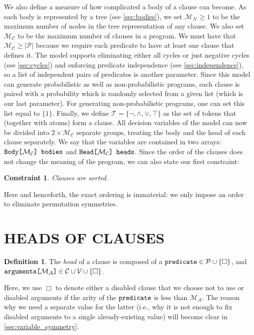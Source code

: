 \documentclass[letterpaper]{article}
\newtheorem{constraint}{Constraint}
\theoremstyle{definition}
\newtheorem{definition}{Definition}
\newcommand{\variable}[1]{\texttt{\textup{#1}}}
\newcommand{\arrayd}[3]{\variable{{#1}[}{#2}\variable{]} \in {#3}}
\newcommand{\arrayt}[3]{\variable{{#3}[}{#2}\variable{] {#1}}}
\newcommand{\predicates}{\mathcal{P}}
\newcommand{\variables}{\mathcal{V}}
\newcommand{\constants}{\mathcal{C}}
\newcommand{\tokens}{\mathcal{T}}
\newcommand{\maxArity}{\mathcal{M}_{\mathcal{A}}}
\newcommand{\maxNumNodes}{\mathcal{M}_{\mathcal{N}}}
\newcommand{\maxNumClauses}{\mathcal{M}_{\mathcal{C}}}
\begin{document}
We also define a measure of how complicated a body of a clause can become. As
each body is represented by a tree (see \cref{sec:bodies}), we set
$\maxNumNodes{} \ge 1$ to be the maximum number of nodes in the tree
representation of any clause. We also set $\maxNumClauses{}$ to be the maximum
number of clauses in a program. We must have that $\maxNumClauses{} \ge
|\predicates{}|$ because we require each predicate to have at least one clause
that defines it. The model supports eliminating either all cycles or just
negative cycles (see \cref{sec:cycles}) and enforcing predicate independence
(see \cref{sec:independence}), so a list of independent pairs of predicates is
another parameter. Since this model can generate probabilistic as well as
non-probabilistic programs, each clause is paired with a probability which is
randomly selected from a given list (which is our last parameter). For
generating non-probabilistic programs, one can set this list equal to $\{ 1 \}$.
Finally, we define $\tokens{} = \{ \neg, \land, \lor, \top \}$ as the set of
tokens that (together with atoms) form a clause. All decision variables of the
model can now be divided into $2 \times \maxNumClauses{}$ separate groups,
treating the body and the head of each clause separately. We say that the
variables are contained in two arrays: $\arrayt{bodies}{\maxNumClauses{}}{Body}$
and $\arrayt{heads}{\maxNumClauses{}}{Head}$. Since the order of the clauses
does not change the meaning of the program, we can also state our first
constraint:

\begin{constraint}
  Clauses are sorted.
\end{constraint}

Here and henceforth, the exact ordering is immaterial: we only impose an order
to eliminate permutation symmetries.

\section{HEADS OF CLAUSES} \label{sec:heads}

\begin{definition}
  The \emph{head} of a clause is composed of a $\variable{predicate} \in
  \predicates \cup \{ \Box \}$, and
  $\arrayd{arguments}{\maxArity{}}{\constants{} \cup \variables{}} \cup \{ \Box
  \}$.
\end{definition}

Here, we use $\Box$ to denote either a disabled clause that we choose not to use
or disabled arguments if the arity of the $\variable{predicate}$ is less than
$\maxArity{}$. The reason why we need a separate value for the latter (i.e., why
it is not enough to fix disabled arguments to a single already-existing value)
will become clear in \cref{sec:variable_symmetry}.
\end{document}

